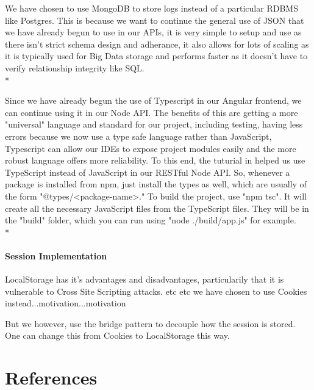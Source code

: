 \documentclass[11pt]{article}
\begin{document}
We have chosen to use MongoDB to store logs instead of a particular RDBMS like Postgres. This is because we want to continue the general use of JSON that we have already begun to use in our APIs, it is very simple to setup and use\cite{Website:10} as there isn't strict schema design and adherance\cite{Website:11}, it also allows for lots of scaling\cite{Website:10} as it is typically used for Big Data storage\cite{Website:12} and performs faster as it doesn't have to verify relationship integrity like SQL\cite{Website:11}.\\*

Since we have already begun the use of Typescript in our Angular frontend, we can continue using it in our Node API. The benefits of this are getting a more "universal" language and standard for our project, including testing, having less errors because we now use a type safe language rather than JavaScript, Typescript can allow our IDEs to expose project modules easily and the more robust language offers more reliability\cite{Website:9}. To this end, the tuturial in \cite{Website:9} helped us use TypeScript instead of JavaScript in our RESTful Node API. So, whenever a package is installed from npm, just install the types as well, which are usually of the form "@types/<package-name>." To build the project, use "npm tsc". It will create all the necessary JavaScript files from the TypeScript files. They will be in the "build" folder, which you can run using "node ./build/app.js" for example.\\*

\paragraph{Session Implementation}
LocalStorage has it's advantages and disadvantages, particularily that it is vulnerable to Cross Site Scripting attacks. etc etc we have chosen to use Cookies instead...motivation...motivation\par

But we however, use the bridge pattern to decouple how the session is stored. One can change this from Cookies to LocalStorage this way.

\section{References}


\end{document}

